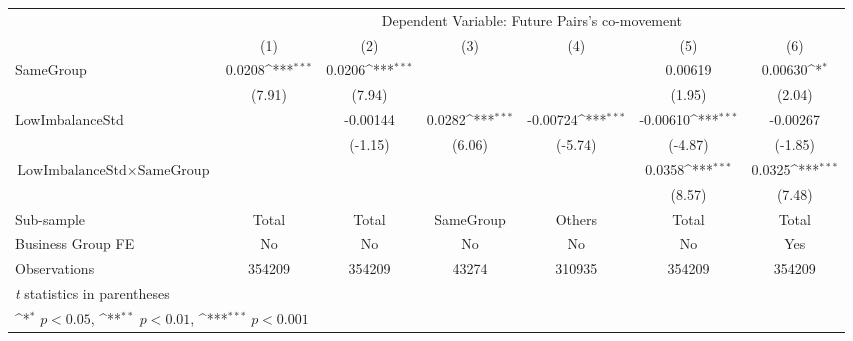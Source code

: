 {
\def\sym#1{\ifmmode^{#1}\else\(^{#1}\)\fi}
\begin{tabular}{l*{6}{c}}
\hline\hline
                    &\multicolumn{6}{c}{Dependent Variable:  Future Pairs's co-movement}                                                                \\\cmidrule(lr){2-7}
                    &\multicolumn{1}{c}{(1)}         &\multicolumn{1}{c}{(2)}         &\multicolumn{1}{c}{(3)}         &\multicolumn{1}{c}{(4)}         &\multicolumn{1}{c}{(5)}         &\multicolumn{1}{c}{(6)}         \\
\hline
SameGroup           &      0.0208\sym{***}&      0.0206\sym{***}&                     &                     &     0.00619         &     0.00630\sym{*}  \\
                    &      (7.91)         &      (7.94)         &                     &                     &      (1.95)         &      (2.04)         \\
[1em]
LowImbalanceStd     &                     &    -0.00144         &      0.0282\sym{***}&    -0.00724\sym{***}&    -0.00610\sym{***}&    -0.00267         \\
                    &                     &     (-1.15)         &      (6.06)         &     (-5.74)         &     (-4.87)         &     (-1.85)         \\
[1em]
 $ \text{LowImbalanceStd} \times {\text{SameGroup} } $ &                     &                     &                     &                     &      0.0358\sym{***}&      0.0325\sym{***}\\
                    &                     &                     &                     &                     &      (8.57)         &      (7.48)         \\
\hline
Sub-sample          &       Total         &       Total         &   SameGroup         &      Others         &       Total         &       Total         \\
Business Group FE   &          No         &          No         &          No         &          No         &          No         &         Yes         \\
Observations        &      354209         &      354209         &       43274         &      310935         &      354209         &      354209         \\
\hline\hline \multicolumn{7}{l}{\footnotesize \textit{t} statistics in parentheses}\\ \multicolumn{7}{l}{\footnotesize \sym{*} \(p<0.05\), \sym{**} \(p<0.01\), \sym{***} \(p<0.001\)}\\ \end{tabular}}
